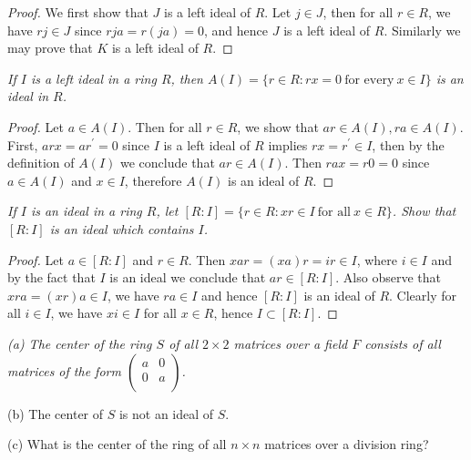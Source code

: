 \begin{proof}
We first show that $J$ is a left ideal of $R$. Let $j\in J$, then for all $r\in R$, we have $rj\in J$ since $rja=r(ja)=0$, and hence $J$ is a left ideal of $R$. Similarly we may prove that $K$ is a left ideal of $R$.
\end{proof}
\begin{problem}\em
If $I$ is a left ideal in a ring $R$, then $A(I)=\{r\in R:rx=0\ \text{for every}\ x\in I\}$ is an ideal in $R$.
\end{problem}
\begin{proof}
Let $a\in A(I)$. Then for all $r\in R$, we show that $ar\in A(I),ra\in A(I)$. First, $arx=ar^\prime=0$ since $I$ is a left ideal of $R$ implies $rx=r^\prime\in I$, then by the definition of $A(I)$ we conclude that $ar\in A(I)$. Then $rax=r0=0$ since $a\in A(I)$ and $x\in I$, therefore $A(I)$ is an ideal of $R$.
\end{proof}
\begin{problem}\em
If $I$ is an ideal in a ring $R$, let $[R:I]=\{r\in R:xr\in I\ \text{for all}\ x\in R\}$. Show that $[R:I]$ is an ideal which contains $I$.
\end{problem}
\begin{proof}
Let $a\in[R:I]$ and $r\in R$. Then $xar=\left( xa \right) r=ir\in I$, where $i\in I$ and by the fact that $I$ is an ideal we conclude that $ar\in[R:I]$. Also observe that $xra=(xr)a\in I$, we have $ra\in I$ and hence $[R:I]$ is an ideal of $R$. Clearly for all $i\in I$, we have $xi\in I$ for all $x\in R$, hence $I\subset[R:I]$.
\end{proof}
\begin{problem}\em
(a) The center of the ring $S$ of all $2\times 2$ matrices over a field $F$ consists of all matrices of the form $
\left( \begin{matrix}
	a&		0\\
	0&		a\\
\end{matrix} \right) 
$.\par
(b) The center of $S$ is not an ideal of $S$.\par
(c) What is the center of the ring of all $n\times n$ matrices over a division ring?
\end{problem}
